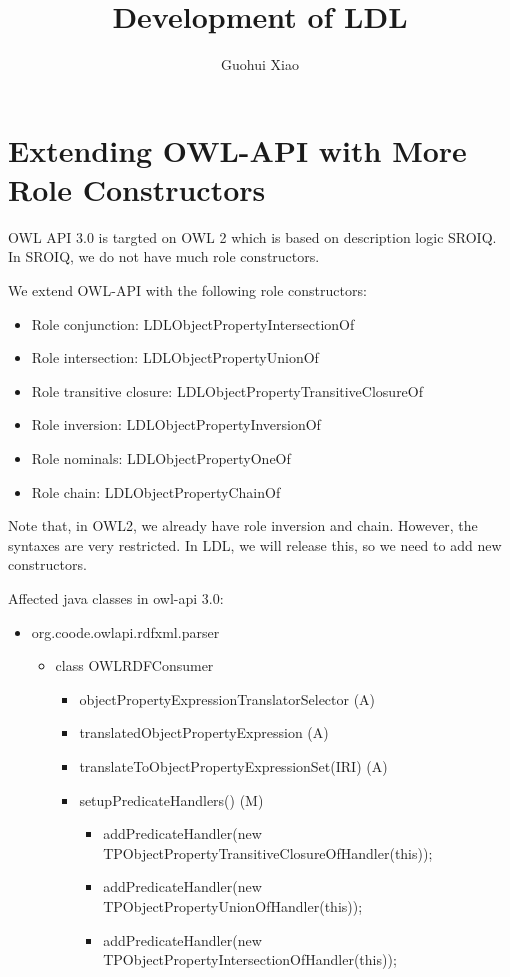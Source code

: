 \documentclass{article}
\begin{document}
	\title{Development of LDL}
	\author{Guohui Xiao}
	\maketitle
	
	\section{Extending OWL-API with More Role Constructors}
	
	OWL API 3.0 is targted on OWL 2 which is based on description logic SROIQ. 
	In SROIQ, we do not have much role constructors.
	
	We extend OWL-API with the following role constructors:
	
	\begin{itemize}
    \item Role conjunction: LDLObjectPropertyIntersectionOf
    \item Role intersection: LDLObjectPropertyUnionOf
    \item Role transitive closure: LDLObjectPropertyTransitiveClosureOf
    \item Role inversion: LDLObjectPropertyInversionOf
    \item Role nominals: LDLObjectPropertyOneOf
    \item Role chain: LDLObjectPropertyChainOf
    \end{itemize}
	
	Note that, in OWL2, we already have role inversion and chain. 
	However, the syntaxes are very restricted. 
	In LDL, we will release this, so we need to add new constructors.
	
	Affected java classes in owl-api 3.0:
	
	\begin{itemize}
      \item org.coode.owlapi.rdfxml.parser
      \begin{itemize}
        \item class OWLRDFConsumer 
        	\begin{itemize}
        	\item objectPropertyExpressionTranslatorSelector (A)
        	\item translatedObjectPropertyExpression (A)
        	\item translateToObjectPropertyExpressionSet(IRI) (A)
        	\item setupPredicateHandlers() (M)
        	\begin{itemize}
             \item addPredicateHandler(new TPObjectPropertyTransitiveClosureOfHandler(this));
        	\item addPredicateHandler(new TPObjectPropertyUnionOfHandler(this));
        	\item addPredicateHandler(new TPObjectPropertyIntersectionOfHandler(this));
        
              \end{itemize}
        \end{itemize}
      \end{itemize}
    \end{itemize}
	
\end{document}
